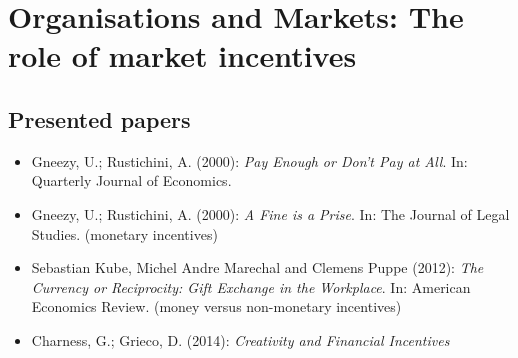 

\chapter{Organisations and Markets: The role of market incentives}

\section{Presented papers}

\begin{itemize}
	\item Gneezy, U.; Rustichini, A. (2000): \textit{Pay Enough or Don't Pay at All}. In: Quarterly Journal of Economics.
	\item Gneezy, U.; Rustichini, A. (2000): \textit{A Fine is a Prise}. In: The Journal of Legal Studies. (monetary incentives)
	\item Sebastian Kube, Michel Andre Marechal and Clemens Puppe (2012): \textit{The Currency or Reciprocity: Gift Exchange in the Workplace}. In: American Economics Review. (money versus non-monetary incentives)
	\item Charness, G.; Grieco, D. (2014): \textit{Creativity and Financial Incentives} 
\end{itemize}


\newpage